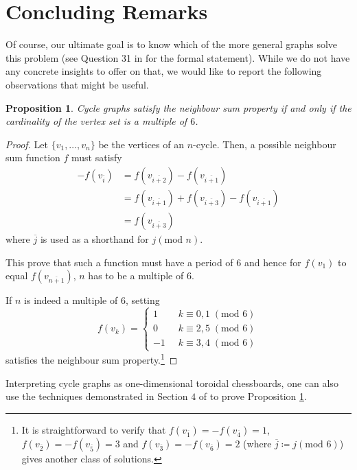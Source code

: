 \documentclass[11pt]{article}
\newtheorem{prp}[nummer]{Proposition}
\begin{document}
\section{Concluding Remarks}\label{rem}
Of course, our ultimate goal is to know which of the more general graphs solve this problem (see Question 31 in \cite{sayan} for the formal statement). While we do not have any concrete insights to offer on that, we would like to report the following observations that might be useful.
\begin{prp}\label{cycle}
    Cycle graphs satisfy the neighbour sum property if and only if the cardinality of the vertex set is a multiple of $6$.
\end{prp}
\begin{proof}
    Let $\{v_1,\dots , v_n\}$ be the vertices of an $n$-cycle. Then, a possible neighbour sum function $f$ must satisfy
    \begin{align*}
        -f(v_{\overline{i}})
        &= f(v_{\overline{i+2}}) - f(v_{\overline{i+1}})\\
        &= f(v_{\overline{i+1}}) + f(v_{\overline{i+3}}) - f(v_{\overline{i+1}})\\
        &= f(v_{\overline{i+3}})
    \end{align*}
    where $\overline j$ is used as a shorthand for $j(\text{mod } n)$.

    This prove that such a function must have a period of $6$ and hence for $f(v_1)$ to equal $f(v_{\overline{n+1}})$, $n$ has to be a multiple of $6$.

    If $n$ is indeed a multiple of $6$, setting $$f(v_k)=\begin{cases}
        1\;\;&k\equiv  0,1\;(\text{mod } 6)\\
        0\;\;&k\equiv 2,5\;(\text{mod } 6)\\
        -1\;\;&k\equiv 3,4\;(\text{mod } 6)
        
    \end{cases}$$ satisfies the neighbour sum property.\footnote{It is straightforward to verify that $f(v_{\overline 1})=-f(v_{\overline 4})=1$, $f(v_{\overline 2})=-f(v_{\overline 5})=3$ and $f(v_{\overline 3})=-f(v_{\overline 6})=2$ (where $\overline j \coloneqq j(\text{mod } 6)$) gives another class of solutions.} 
\end{proof}

Interpreting cycle graphs as one-dimensional toroidal chessboards, one can also use the techniques demonstrated in Section $4$ of \cite{sayan} to prove Proposition \ref{cycle}.
\end{document}
